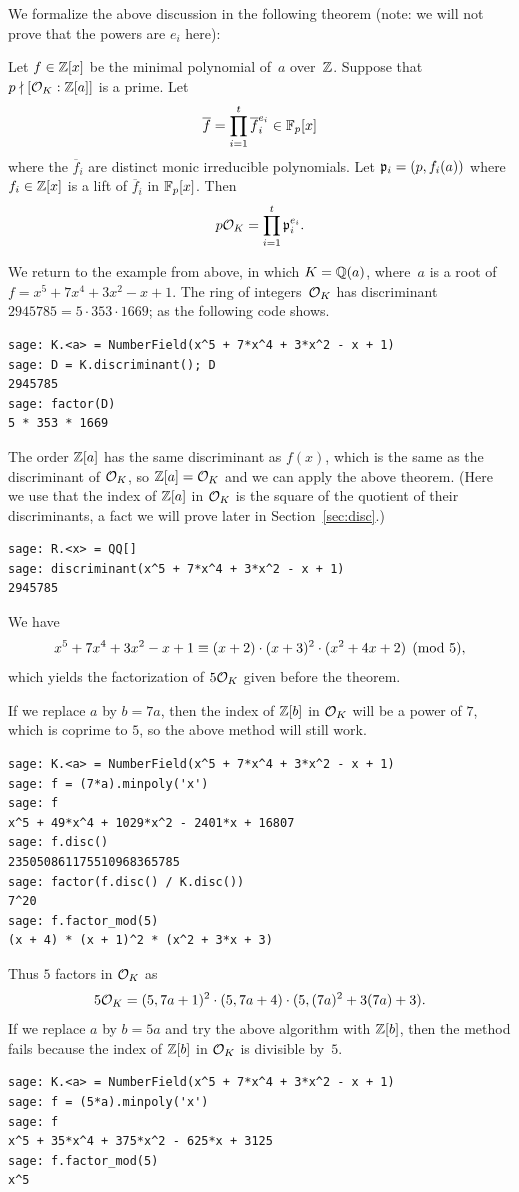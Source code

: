 We formalize the above discussion in the following theorem (note: we will 
not prove that the powers are $e_i$ here):
\begin{theorem}\label{thm:fac1}
Let $f\in\mathbb{Z}[x]$ be the minimal polynomial of~$a$ over~$\mathbb{Z}$.
Suppose that~$p\nmid [\mathcal{O}_K:\mathbb{Z}[a]]$ is a prime.
Let
$$
 \overline{f} = \prod_{i=1}^t \overline{f}_i^{e_i} \in \mathbb{F}_p[x]
$$
where the $\overline{f}_i$ are distinct monic irreducible
polynomials.  
Let 
$
  \mathfrak{p}_i = (p,f_i(a))
$
where $f_i\in\mathbb{Z}[x]$ is a lift of $\overline{f}_i$ in $\mathbb{F}_p[x]$.
Then
$$
  p\mathcal{O}_K = \prod_{i=1}^t \mathfrak{p}_i^{e_i}.
$$
\end{theorem}

We return to the example from above, in which $K=\mathbb{Q}(a)$, where~$a$ is
a root of $f = x^5+7x^4+3x^2-x+1$.  The ring
of integers~$\mathcal{O}_K$ has discriminant $2945785 = 5\cdot 353\cdot 1669$; as the following \sage code shows.
\begin{verbatim}
sage: K.<a> = NumberField(x^5 + 7*x^4 + 3*x^2 - x + 1)
sage: D = K.discriminant(); D
2945785
sage: factor(D)
5 * 353 * 1669
\end{verbatim}
The order $\mathbb{Z}[a]$ has the same discriminant as $f(x)$, which
is the same as the discriminant of $\mathcal{O}_K$, so
$\mathbb{Z}[a]=\mathcal{O}_K$ and we can apply the above theorem.
(Here we use that the index of $\mathbb{Z}[a]$ in $\mathcal{O}_K$
is the square of the quotient of their discriminants, 
a fact we will prove later in Section~\ref{sec:disc}.)
\begin{verbatim}
sage: R.<x> = QQ[]
sage: discriminant(x^5 + 7*x^4 + 3*x^2 - x + 1)
2945785
\end{verbatim}
We have
$$
  x^5+7x^4+3x^2-x+1 \equiv (x+2)\cdot (x+3)^2 \cdot (x^2+4x+2)\pmod{5},
$$
which yields the factorization of $5\mathcal{O}_K$ given before the theorem.

If we replace $a$ by $b=7a$, then the index of $\mathbb{Z}[b]$
in $\mathcal{O}_K$ will be a power of $7$, which is coprime to $5$,
so the above method will still work.
\begin{verbatim}
sage: K.<a> = NumberField(x^5 + 7*x^4 + 3*x^2 - x + 1)
sage: f = (7*a).minpoly('x')
sage: f
x^5 + 49*x^4 + 1029*x^2 - 2401*x + 16807
sage: f.disc()
235050861175510968365785
sage: factor(f.disc() / K.disc())
7^20
sage: f.factor_mod(5)
(x + 4) * (x + 1)^2 * (x^2 + 3*x + 3)
\end{verbatim}
Thus $5$ factors in $\mathcal{O}_K$ 
as 
$$
  5\mathcal{O}_K = (5, 7a+1)^2 \cdot (5, 7a+4) \cdot (5, (7a)^2 + 3(7a) + 3).
$$
If we replace $a$ by $b=5a$ and try the above algorithm with $\mathbb{Z}[b]$,
then the method fails because the index of $\mathbb{Z}[b]$ in $\mathcal{O}_K$ is divisible
by~$5$.
\begin{verbatim}
sage: K.<a> = NumberField(x^5 + 7*x^4 + 3*x^2 - x + 1)
sage: f = (5*a).minpoly('x')
sage: f
x^5 + 35*x^4 + 375*x^2 - 625*x + 3125
sage: f.factor_mod(5)
x^5
\end{verbatim}

